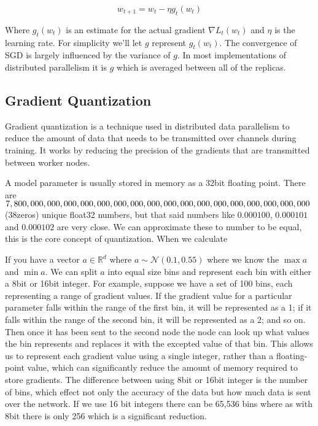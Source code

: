 \documentclass[11pt]{article}
\begin{document}
$$
w_{t+1} = w_t - \eta g_t(w_t)
$$

Where $g_t(w_t)$ is an estimate for the actual gradient ${\nabla} L_t(w_t)$ and $\eta$ is the learning rate. For simplicity we'll let $g$ represent $g_t(w_t)$. The convergence of SGD is largely influenced by the variance of $g$. In most implementations of distributed parallelism it is $g$ which is averaged between all of the replicas.


\subsection{Gradient Quantization}
Gradient quantization is a technique used in distributed data parallelism to reduce the amount of data that needs to be transmitted over channels during training. It works by reducing the precision of the gradients that are transmitted between worker nodes.

A model parameter is usually stored in memory as a 32bit floating point. There are $7, 800, 000, 000,\\ 000, 000,000,000,000,000,000,000,000,000,000,000,000,000,000$(38zeros) unique float32 numbers, but that said numbers like $0.000100$, $0.000101$ and $0.000102$ are very close. We can approximate these to number to be equal, this is the core concept of quantization. When we calculate 

If you have a vector $a \in \mathbb{R}^d$ where $a \sim \mathcal{N}(0.1,0.55)$ where we know the $\max a$ and $\min a$. We can split $a$ into equal size bins and represent each bin with either a 8bit or 16bit integer. For example, suppose we have a set of 100 bins, each representing a range of gradient values. If the gradient value for a particular parameter falls within the range of the first bin, it will be represented as a 1; if it falls within the range of the second bin, it will be represented as a 2; and so on. Then once it has been sent to the second node the node can look up what values the bin represents and replaces it with the excepted value of that bin. This allows us to represent each gradient value using a single integer, rather than a floating-point value, which can significantly reduce the amount of memory required to store gradients. The difference between using 8bit or 16bit integer is the number of bins, which effect not only the accuracy of the data but how much data is sent over the network. If we use 16 bit integers there can be 65,536 bins where as with 8bit there is only 256 which is a significant reduction.
\end{document}
